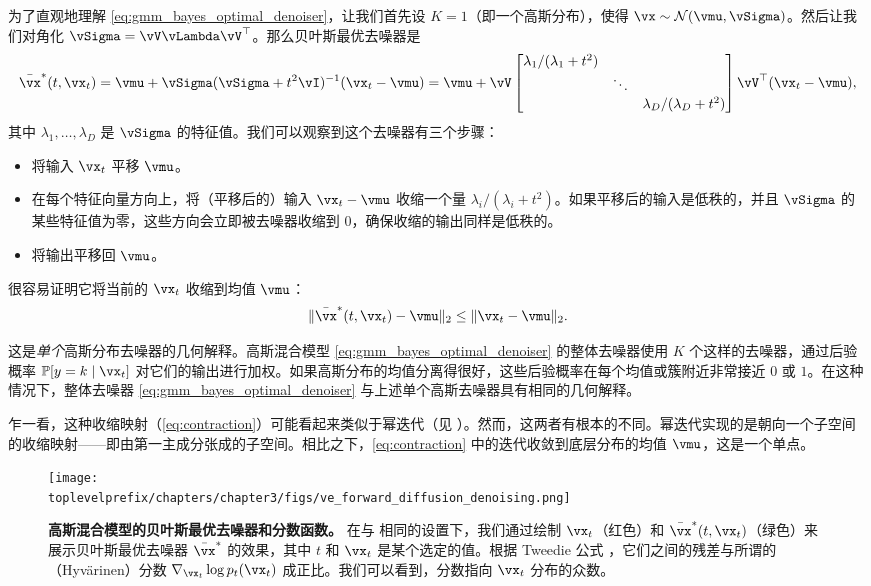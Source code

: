 \documentclass[../../book-main.tex]{subfiles}
\begin{document}
\begin{example}[从高斯混合模型中去噪高斯噪声]
	为了直观地理解 \eqref{eq:gmm_bayes_optimal_denoiser}，让我们首先设 \(K = 1\)（即一个高斯分布），使得 \(\vx \sim \dNorm(\vmu, \vSigma)\)。然后让我们对角化 \(\vSigma = \vV\vLambda \vV^{\top}\)。那么贝叶斯最优去噪器是
	\begin{equation}
		\bar{\vx}^{\ast}(t, \vx_{t}) = \vmu + \vSigma(\vSigma + t^{2}\vI)^{-1}(\vx_{t} - \vmu) = \vmu + \vV\mat{\lambda_{1}/(\lambda_{1} + t^{2}) & & \\ & \ddots & \\ & & \lambda_{D}/(\lambda_{D} + t^{2})}\vV^{\top}(\vx_{t} - \vmu),
	\end{equation}
	其中 \(\lambda_{1}, \dots, \lambda_{D}\) 是 \(\vSigma\) 的特征值。我们可以观察到这个去噪器有三个步骤：
	\begin{itemize}
		\item 将输入 \(\vx_{t}\) 平移 \(\vmu\)。
		\item 在每个特征向量方向上，将（平移后的）输入 \(\vx_{t} - \vmu\) 收缩一个量 \(\lambda_{i}/(\lambda_{i} + t^{2})\)。如果平移后的输入是低秩的，并且 \(\vSigma\) 的某些特征值为零，这些方向会立即被去噪器收缩到 \(0\)，确保收缩的输出同样是低秩的。
		\item 将输出平移回 \(\vmu\)。
	\end{itemize}
	很容易证明它将当前的 \(\vx_{t}\) 收缩到均值 \(\vmu\)：
	\begin{equation}\label{eq:contraction}
		\norm{\bar{\vx}^{\ast}(t, \vx_{t}) - \vmu}_{2} \leq \norm{\vx_{t} - \vmu}_{2}.
	\end{equation}

	这是\textit{单个}高斯分布去噪器的几何解释。高斯混合模型 \eqref{eq:gmm_bayes_optimal_denoiser} 的整体去噪器使用 \(K\) 个这样的去噪器，通过后验概率 \(\Pr[y = k \mid \vx_{t}]\) 对它们的输出进行加权。如果高斯分布的均值分离得很好，这些后验概率在每个均值或簇附近非常接近 \(0\) 或 \(1\)。在这种情况下，整体去噪器 \eqref{eq:gmm_bayes_optimal_denoiser} 与上述单个高斯去噪器具有相同的几何解释。

    乍一看，这种收缩映射（\eqref{eq:contraction}）可能看起来类似于幂迭代（见 ）。然而，这两者有根本的不同。幂迭代实现的是朝向一个子空间的收缩映射——即由第一主成分张成的子空间。相比之下，\eqref{eq:contraction} 中的迭代收敛到底层分布的均值 \(\vmu\)，这是一个单点。
\end{example}

\begin{figure}
	\centering 
	\texttt{[image: \\toplevelprefix/chapters/chapter3/figs/ve\_forward\_diffusion\_denoising.png]}\vspace{-0.15in}
	\caption{\small \textbf{高斯混合模型的贝叶斯最优去噪器和分数函数。} 在与  相同的设置下，我们通过绘制 \(\vx_{t}\)（红色）和 \(\bar{\vx}^{\ast}(t, \vx_{t})\)（绿色）来展示贝叶斯最优去噪器 \(\bar{\vx}^{\ast}\) 的效果，其中 \(t\) 和 \(\vx_{t}\) 是某个选定的值。根据 Tweedie 公式 ，它们之间的残差与所谓的（Hyv\"arinen）分数 \(\nabla_{\vx_{t}}\log p_{t}(\vx_{t})\) 成正比。我们可以看到，分数指向 \(\vx_{t}\) 分布的众数。}
	\label{fig:ve_forward_denoising}
\end{figure}
\end{document}
